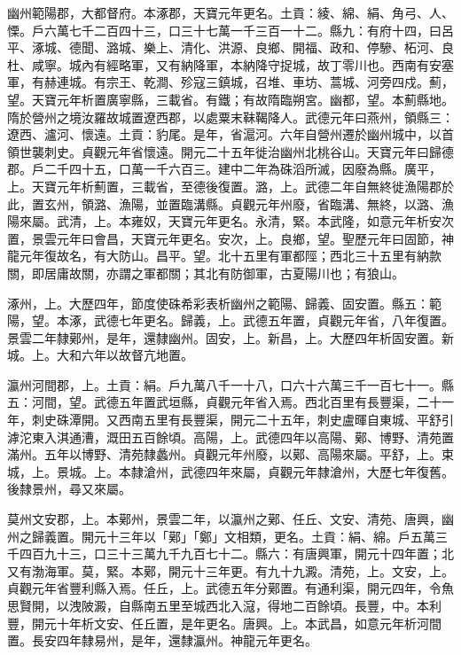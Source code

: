 \begin{pinyinscope}
 幽州範陽郡，大都督府。本涿郡，天寶元年更名。土貢：綾、綿、絹、角弓、人、慄。戶六萬七千二百四十三，口三十七萬一千三百一十二。縣九：有府十四，曰呂平、涿城、德聞、潞城、樂上、清化、洪源、良鄉、開福、政和、停驂、柘河、良杜、咸寧。城內有經略軍，又有納降軍，本納降守捉城，故丁零川也。西南有安塞軍，有赫連城。有宗王、乾澗、殄寇三鎮城，召堆、車坊、蒿城、河旁四戍。薊，望。天寶元年析置廣寧縣，三載省。有鐵；有故隋臨朔宮。幽都，望。本薊縣地。隋於營州之境汝羅故城置遼西郡，以處粟末靺鞨降人。武德元年曰燕州，領縣三：遼西、瀘河、懷遠。土貢：豹尾。是年，省滬河。六年自營州遷於幽州城中，以首領世襲刺史。貞觀元年省懷遠。開元二十五年徙治幽州北桃谷山。天寶元年曰歸德郡。戶二千四十五，口萬一千六百三。建中二年為硃滔所滅，因廢為縣。廣平，上。天寶元年析薊置，三載省，至德後復置。潞，上。武德二年自無終徙漁陽郡於此，置玄州，領潞、漁陽，並置臨溝縣。貞觀元年州廢，省臨溝、無終，以潞、漁陽來屬。武清，上。本雍奴，天寶元年更名。永清，緊。本武隆，如意元年析安次置，景雲元年曰會昌，天寶元年更名。安次，上。良鄉，望。聖歷元年曰固節，神龍元年復故名，有大防山。昌平。望。北十五里有軍都陘；西北三十五里有納款關，即居庸故關，亦謂之軍都關；其北有防御軍，古夏陽川也；有狼山。



 涿州，上。大歷四年，節度使硃希彩表析幽州之範陽、歸義、固安置。縣五：範陽，望。本涿，武德七年更名。歸義，上。武德五年置，貞觀元年省，八年復置。景雲二年隸鄚州，是年，還隸幽州。固安，上。新昌，上。大歷四年析固安置。新城。上。大和六年以故督亢地置。



 瀛州河間郡，上。土貢：絹。戶九萬八千一十八，口六十六萬三千一百七十一。縣五：河間，望。武德五年置武垣縣，貞觀元年省入焉。西北百里有長豐渠，二十一年，刺史硃潭開。又西南五里有長豐渠，開元二十五年，刺史盧暉自東城、平舒引滹沱東入淇通漕，溉田五百餘頃。高陽，上。武德四年以高陽、鄚、博野、清苑置滿州。五年以博野、清苑隸蠡州。貞觀元年州廢，以鄚、高陽來屬。平舒，上。束城，上。景城。上。本隸滄州，武德四年來屬，貞觀元年隸滄州，大歷七年復舊。後隸景州，尋又來屬。



 莫州文安郡，上。本鄚州，景雲二年，以瀛州之鄚、任丘、文安、清苑、唐興，幽州之歸義置。開元十三年以「鄚」「鄭」文相類，更名。土貢：絹、綿。戶五萬三千四百九十三，口三十三萬九千九百七十二。縣六：有唐興軍，開元十四年置；北又有渤海軍。莫，緊。本鄚，開元十三年更。有九十九澱。清苑，上。文安，上。貞觀元年省豐利縣入焉。任丘，上。武德五年分鄚置。有通利渠，開元四年，令魚思賢開，以洩陂澱，自縣南五里至城西北入滱，得地二百餘頃。長豐，中。本利豐，開元十年析文安、任丘置，是年更名。唐興。上。本武昌，如意元年析河間置。長安四年隸易州，是年，還隸瀛州。神龍元年更名。




\end{pinyinscope}
